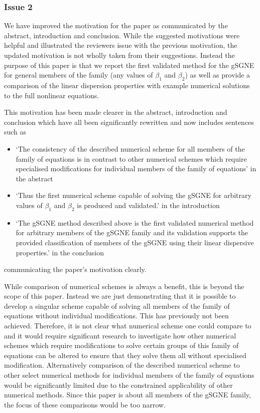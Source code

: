 \documentclass[10pt]{article}
\begin{document}
\subsubsection{Issue 2}
We have improved the motivation for the paper as communicated by the abstract, introduction and conclusion. While the suggested motivations were helpful and illustrated the reviewers issue with the previous motivation, the updated motivation is not wholly taken from their suggestions. Instead the purpose of this paper is that we report the first validated method for the gSGNE for general members of the family (any values of $\beta_1$ and $\beta_2$) as well as provide a comparison of the linear dispersion properties with example numerical solutions to the full nonlinear equations.

This motivation has been made clearer in the abstract, introduction and conclusion which have all been significantly rewritten and now includes sentences such as
\begin{itemize}
\item `The consistency of the described numerical scheme for all members of the family of equations is in contrast to other numerical schemes which require specialised modifications for individual members of the family of equations' in the abstract
	
\item`Thus the first numerical scheme capable of solving the gSGNE for arbitrary values of $\beta_1$ and $\beta_2$ is produced and validated.' in the introduction
	
\item`The gSGNE method described above is the first validated numerical method for arbitrary members of the gSGNE family and its validation supports the provided classification of members of the gSGNE using their linear dispersive properties.' in the conclusion
\end{itemize}
communicating the paper's motivation clearly. 


While comparison of numerical schemes is always a benefit, this is beyond the scope of this paper.
Instead we are just demonstrating that it is possible to develop a singular scheme capable of solving all members of the family of equations without individual modifications. This has previously not been achieved. Therefore, it is not clear what numerical scheme one could compare to and it would require significant research to investigate how other
numerical schemes which require modifications to solve certain groups of this family of equations can be altered to ensure that they solve them all without specialised modification. Alternatively comparison of the described numerical scheme to other select numerical methods for individual members of the family of equations would be significantly limited due to the constrained applicability of other numerical methods. Since this paper is about all members of the gSGNE  family, the focus of these comparisons would be too narrow.
\end{document}
